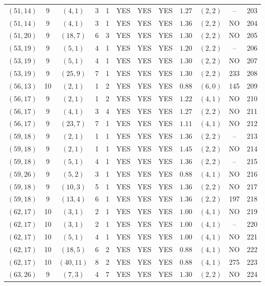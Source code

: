 \begin{longtable}{|c|c|c|c|c|c|c|c|c|c|c|c|}
$(51,14)$ & 9 & $(4,1)$ & 3 & 1 & YES & YES & YES & $1.27$ & $(2,2)$ & -- & 203\\
$(51,14)$ & 9 & $(4,1)$ & 3 & 1 & YES & YES & YES & $1.36$ & $(2,2)$ & NO & 204\\
$(51,20)$ & 9 & $(18,7)$ & 6 & 3 & YES & YES & YES & $1.30$ & $(2,2)$ & NO & 205\\
$(53,19)$ & 9 & $(5,1)$ & 4 & 1 & YES & YES & YES & $1.20$ & $(2,2)$ & -- & 206\\
$(53,19)$ & 9 & $(5,1)$ & 4 & 1 & YES & YES & YES & $1.30$ & $(2,2)$ & NO & 207\\
$(53,19)$ & 9 & $(25,9)$ & 7 & 1 & YES & YES & YES & $1.30$ & $(2,2)$ & 233 & 208\\
$(56,13)$ & 10 & $(2,1)$ & 1 & 2 & YES & YES & YES & $0.88$ & $(6,0)$ & 145 & 209\\
$(56,17)$ & 9 & $(2,1)$ & 1 & 2 & YES & YES & YES & $1.22$ & $(4,1)$ & NO & 210\\
$(56,17)$ & 9 & $(4,1)$ & 3 & 4 & YES & YES & YES & $1.27$ & $(2,2)$ & NO & 211\\
$(56,17)$ & 9 & $(23,7)$ & 7 & 1 & YES & YES & YES & $1.11$ & $(4,1)$ & NO & 212\\
$(59,18)$ & 9 & $(2,1)$ & 1 & 1 & YES & YES & YES & $1.36$ & $(2,2)$ & -- & 213\\
$(59,18)$ & 9 & $(2,1)$ & 1 & 1 & YES & YES & YES & $1.45$ & $(2,2)$ & NO & 214\\
$(59,18)$ & 9 & $(5,1)$ & 4 & 1 & YES & YES & YES & $1.36$ & $(2,2)$ & -- & 215\\
$(59,26)$ & 9 & $(5,2)$ & 3 & 1 & YES & YES & YES & $0.88$ & $(4,1)$ & NO & 216\\
$(59,18)$ & 9 & $(10,3)$ & 5 & 1 & YES & YES & YES & $1.36$ & $(2,2)$ & NO & 217\\
$(59,18)$ & 9 & $(13,4)$ & 6 & 1 & YES & YES & YES & $1.36$ & $(2,2)$ & 197 & 218\\
$(62,17)$ & 10 & $(3,1)$ & 2 & 1 & YES & YES & YES & $1.00$ & $(4,1)$ & NO & 219\\
$(62,17)$ & 10 & $(3,1)$ & 2 & 1 & YES & YES & YES & $1.00$ & $(4,1)$ & -- & 220\\
$(62,17)$ & 10 & $(5,1)$ & 4 & 1 & YES & YES & YES & $1.00$ & $(4,1)$ & NO & 221\\
$(62,17)$ & 10 & $(18,5)$ & 6 & 2 & YES & YES & YES & $0.88$ & $(4,1)$ & NO & 222\\
$(62,17)$ & 10 & $(40,11)$ & 8 & 2 & YES & YES & YES & $0.88$ & $(4,1)$ & 275 & 223\\
$(63,26)$ & 9 & $(7,3)$ & 4 & 7 & YES & YES & YES & $1.30$ & $(2,2)$ & NO & 224\\

\end{longtable}
